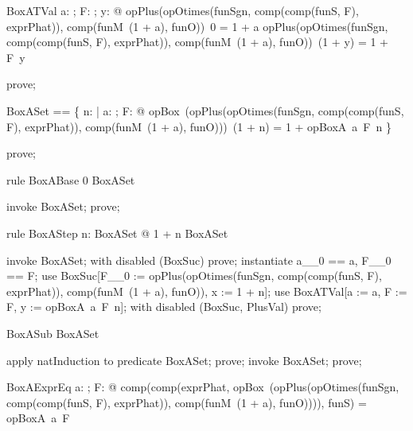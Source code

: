 \documentclass{article}
\begin{document}
\begin{theorem}{BoxATVal}
  \forall a: \nat; F: \nat \fun \nat; y: \nat @ opPlus(opOtimes(funSgn, comp(comp(funS, F), exprPhat)), comp(funM~(1 + a), funO))~0 = 1 + a \land opPlus(opOtimes(funSgn, comp(comp(funS, F), exprPhat)), comp(funM~(1 + a), funO))~(1 + y) = 1 + F~y
\end{theorem}

\begin{zproof}
prove;
\end{zproof}

\begin{zed}
  BoxASet == \{ n: \nat | \forall a: \nat; F: \nat \fun \nat @
    opBox~(opPlus(opOtimes(funSgn, comp(comp(funS, F), exprPhat)), comp(funM~(1 + a), funO)))~(1 + n) = 1 + opBoxA~a~F~n \}
\end{zed}

\begin{zproof}
prove;
\end{zproof}

\begin{theorem}{rule BoxABase}
  0 \in BoxASet
\end{theorem}

\begin{zproof}
invoke BoxASet;
prove;
\end{zproof}

\begin{theorem}{rule BoxAStep}
  \forall n: BoxASet @ 1 + n \in BoxASet
\end{theorem}

\begin{zproof}
invoke BoxASet;
with disabled (BoxSuc) prove;
instantiate a\_\_0 == a, F\_\_0 == F;
use BoxSuc[F\_\_0 := opPlus(opOtimes(funSgn, comp(comp(funS, F), exprPhat)), comp(funM~(1 + a), funO)), x := 1 + n];
use BoxATVal[a := a, F := F, y := opBoxA~a~F~n];
with disabled (BoxSuc, PlusVal) prove;
\end{zproof}

\begin{theorem}{BoxASub}
  \nat \subseteq BoxASet
\end{theorem}

\begin{zproof}
apply natInduction to predicate \nat \subseteq BoxASet;
prove;
invoke BoxASet;
prove;
\end{zproof}

\begin{theorem}{BoxAExprEq}
  \forall a: \nat; F: \nat \fun \nat @ comp(comp(exprPhat, opBox~(opPlus(opOtimes(funSgn, comp(comp(funS, F), exprPhat)), comp(funM~(1 + a), funO)))), funS) = opBoxA~a~F
\end{theorem}
\end{document}
